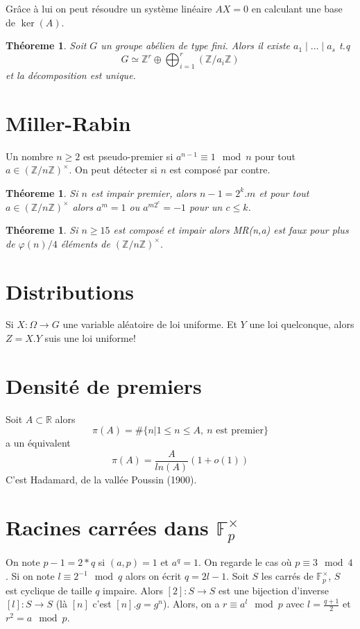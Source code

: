 \documentclass[a4paper,12pt]{book}
\newcommand{\Z}{\mathbb{Z}}
\newcommand{\R}{\mathbb{R}}
\newcommand{\F}{\mathbb F}
\theoremstyle{plain}
\newtheorem{thm}[subsection]{Théoreme}
\theoremstyle{definition}
\theoremstyle{remark}
\begin{document}
Grâce à lui on peut résoudre un système linéaire $AX=0$ en calculant
une base de $\ker(A)$.

\begin{thm}
    Soit $G$ un groupe abélien de type fini. Alors il existe
    $a_1\mid\ldots\mid a_s$ t.q \[G\simeq \Z^r\oplus \bigoplus_{i=1}^r
    (\Z/a_i\Z)\] et la décomposition est unique.
\end{thm}

\section{Miller-Rabin}
Un nombre $n\geq 2$ est pseudo-premier si 
$a^{n-1}\equiv 1\mod n$ pour tout $a\in (\Z/n\Z)^{\times}$.
On peut détecter si $n$ est composé par contre.

\begin{thm}
    Si $n$ est impair premier, alors $n-1=2^k.m$
    et pour tout $a\in(\Z/n\Z)^{\times}$ alors 
    $a^{m}=1$ ou $a^{m2^c}=-1$ pour un $c\leq k$.
\end{thm}

\begin{thm}
    Si $n\geq 15$ est composé et impair alors
    MR(n,a) est faux pour plus de $\varphi(n)/4$
    éléments de $(\Z/n\Z)^{\times}$.
\end{thm}

\section{Distributions}
Si $X\colon\Omega\to G$ une variable aléatoire de loi uniforme.
Et $Y$ une loi quelconque, alors $Z=X.Y$ suis une loi uniforme!

\section{Densité de premiers}
Soit $A\subset \R$ alors 
\[\pi(A)=\#\{n|1\leq n\leq A,~n\textrm{ est premier}\}\]
a un équivalent 
\[\pi(A)=\frac{A}{ln(A)}(1+o(1))\]
C'est Hadamard, de la vallée Poussin (1900).

\section{Racines carrées dans $\F_p^{\times}$}
On note $p-1=2*q$ si $(a,p)=1$ et $a^q=1$. On regarde le cas où 
$p\equiv 3\mod 4$. Si on note $l\equiv 2^{-1} \mod q$ alors on écrit
$q=2l-1$. Soit $S$ les carrés de $\F_p^{\times}$, $S$ est cyclique 
de taille $q$ impaire. Alors $[2]\colon S\to S$ est une bijection
d'inverse $[l]\colon S\to S$ (là $[n]$ c'est $[n].g=g^n$). Alors, 
on a $r\equiv a^l\mod p$ avec $l=\frac{q+1}{2}$ et $r^2=a\mod p$.
\end{document}
